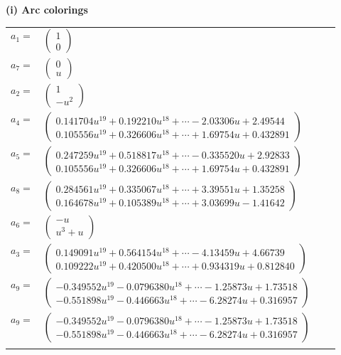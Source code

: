 \documentclass[1p]{elsarticle_modified}
\theoremstyle{definition}
\begin{document}
\flushleft \textbf{(i) Arc colorings}\\
\begin{tabular}{m{7pt} m{180pt} m{7pt} m{180pt} }
\flushright $a_{1}=$&$\begin{pmatrix}1\\0\end{pmatrix}$ \\
\flushright $a_{7}=$&$\begin{pmatrix}0\\u\end{pmatrix}$ \\
\flushright $a_{2}=$&$\begin{pmatrix}1\\- u^2\end{pmatrix}$ \\
\flushright $a_{4}=$&$\begin{pmatrix}0.141704 u^{19}+0.192210 u^{18}+\cdots-2.03306 u+2.49544\\0.105556 u^{19}+0.326606 u^{18}+\cdots+1.69754 u+0.432891\end{pmatrix}$ \\
\flushright $a_{5}=$&$\begin{pmatrix}0.247259 u^{19}+0.518817 u^{18}+\cdots-0.335520 u+2.92833\\0.105556 u^{19}+0.326606 u^{18}+\cdots+1.69754 u+0.432891\end{pmatrix}$ \\
\flushright $a_{8}=$&$\begin{pmatrix}0.284561 u^{19}+0.335067 u^{18}+\cdots+3.39551 u+1.35258\\0.164678 u^{19}+0.105389 u^{18}+\cdots+3.03699 u-1.41642\end{pmatrix}$ \\
\flushright $a_{6}=$&$\begin{pmatrix}- u\\u^3+u\end{pmatrix}$ \\
\flushright $a_{3}=$&$\begin{pmatrix}0.149091 u^{19}+0.564154 u^{18}+\cdots-4.13459 u+4.66739\\0.109222 u^{19}+0.420500 u^{18}+\cdots+0.934319 u+0.812840\end{pmatrix}$ \\
\flushright $a_{9}=$&$\begin{pmatrix}-0.349552 u^{19}-0.0796380 u^{18}+\cdots-1.25873 u+1.73518\\-0.551898 u^{19}-0.446663 u^{18}+\cdots-6.28274 u+0.316957\end{pmatrix}$\\ \flushright $a_{9}=$&$\begin{pmatrix}-0.349552 u^{19}-0.0796380 u^{18}+\cdots-1.25873 u+1.73518\\-0.551898 u^{19}-0.446663 u^{18}+\cdots-6.28274 u+0.316957\end{pmatrix}$\\&\end{tabular}
\end{document}
